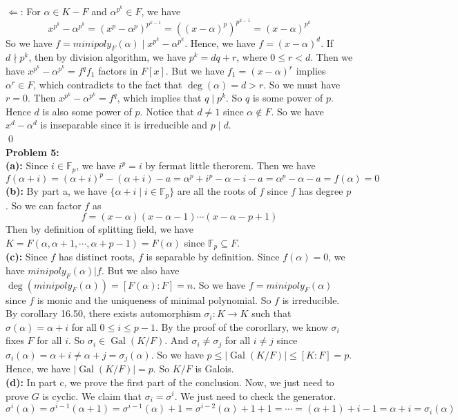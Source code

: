 \documentclass[12pt]{amsart}
\newcommand{\Gal}[0]{\operatorname{Gal}}
\begin{document}
$\Longleftarrow$: For $\alpha\in K-F$ and $\alpha^{p^k}\in F$, we have  
\[x^{p^k}-\alpha^{p^k}=(x^p-\alpha^p)^{p^{k-1}}=((x-\alpha)^p)^{p^{k-1}}=(x-\alpha)^{p^k}\]
So we have $f=minipoly_F(\alpha)\mid x^{p^k}-\alpha^{p^k}$. Hence, we have $f=(x-\alpha)^d$. If $d\nmid p^k$, then by division algorithm, we have $p^k=dq+r$, where $0\leq r<d$. Then we have $x^{p^k}-\alpha^{p^k}=f^qf_1$ factors in $F[x]$. But we have $f_1=(x-\alpha)^r$ implies $\alpha^r\in F$, which contradicts to the fact that $\deg(\alpha)=d>r$. So we must have $r=0$. Then $x^{p^k}-\alpha^{p^k}=f^q$, which implies that $q\mid p^k$. So $q$ is some power of $p$. Hence $d$ is also some power of $p$. Notice that $d\neq 1$ since $\alpha\notin F$. So we have $x^d-\alpha^d$ is inseparable since it is irreducible and $p\mid d$.
\\\qed\\
\textbf{Problem 5:}\\
\textbf{(a):} Since $i\in \mathbb{F}_p$, we have $i^p=i$ by fermat little therorem. Then we have 
\[f(\alpha+i)=(\alpha+i)^p-(\alpha+i)-a=\alpha^p+i^p-\alpha-i-a=\alpha^p-\alpha-a=f(\alpha)=0\]
\textbf{(b):} By part a, we have $\{\alpha+i\mid i\in \mathbb{F}_p\}$ are all the roots of $f$ since $f$ has degree $p$. So we can factor $f$ as 
\[f=(x-\alpha)(x-\alpha-1)\cdots(x-\alpha-p+1)\]
Then by definition of splitting field, we have $K=F(\alpha,\alpha+1,\cdots,\alpha+p-1)=F(\alpha)$ since $\mathbb{F}_p\subseteq F$.
\\\textbf{(c):} Since $f$ has distinct roots, $f$ is separable by definition. Since $f(\alpha)=0$, we have $minipoly_F(\alpha)|f$. But we also have $\deg(minipoly_F(\alpha))=[F(\alpha):F]=n$. So we have $f=minipoly_F(\alpha)$ since $f$ is monic and the uniqueness of minimal polynomial. So $f$ is irreducible. By corollary 16.50, there exists automorphism $\sigma_i:K\to K$ such that $\sigma(\alpha)=\alpha+i$ for all $0\leq i\leq p-1$. By the proof of the cororllary, we know $\sigma_i$ fixes $F$ for all $i$. So $\sigma_i\in \Gal(K/F)$. And $\sigma_i\neq \sigma_j$ for all $i\neq j$ since $\sigma_i(\alpha)=\alpha+i\neq \alpha+j=\sigma_j(\alpha)$. So we have $p\leq |\Gal(K/F)|\leq [K:F]=p$. Hence, we have $|\Gal(K/F)|=p$. So $K/F$ is Galois.
\\\textbf{(d):} In part c, we prove the first part of the conclusion. Now, we just need to prove $G$ is cyclic. We claim that $\sigma_i=\sigma^i$. We just need to check the generator.
\[\sigma^i(\alpha)=\sigma^{i-1}(\alpha+1)=\sigma^{i-1}(\alpha)+1=\sigma^{i-2}(\alpha)+1+1=\cdots=(\alpha+1)+i-1=\alpha+i=\sigma_i(\alpha)\]
\end{document}
